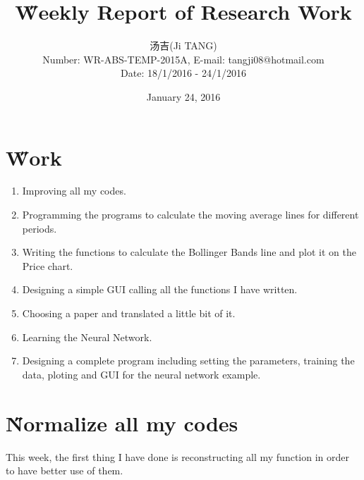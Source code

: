 \documentclass[12pt]{article}
\title{{\H Weekly Report of Research Work\\ }\quad {WR-ABS-TEMP-2015A-No.009}}
\author{汤吉(Ji TANG)\\
               Number: WR-ABS-TEMP-2015A,  E-mail: tangji08@hotmail.com \\
        Date: 18/1/2016 - 24/1/2016}
\date{January 24, 2016}
\begin{document}
  
\maketitle
\pagestyle{fancy}
\fancyhead[LO,RE]{\leftmark} %



\renewcommand{\headrulewidth}{0.4pt}
\renewcommand{\footrulewidth}{0.4pt}



\tableofcontents 
\newpage
\section{\H Work}
\begin{enumerate}
	\item Improving all my codes.
	\item Programming the programs to calculate the moving average lines for different periods.
	\item Writing the functions to calculate the Bollinger Bands line and plot it on the Price chart.
	\item Designing a simple GUI calling all the functions I have written.
	\item Choosing a paper and translated a little bit of it.
	\item Learning the Neural Network.
	\item Designing a complete program including setting the parameters, training the data, ploting and GUI for the neural network example.
\end{enumerate}

\section{\H Normalize all my codes}
This week, the first thing I have done is reconstructing all my function in order to have better use of them. 
\end{document}
